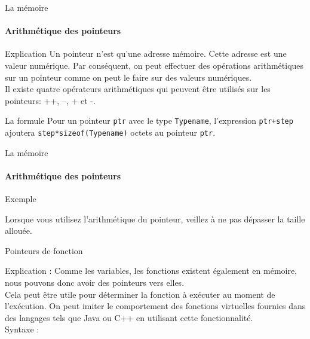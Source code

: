 \documentclass{beamer}
\begin{document}
\begin{darkframes}
	\begin{frame}{La mémoire}
		\framesubtitle{Arithmétique des pointeurs}
		\begin{block}{Explication}
			Un pointeur n'est qu'une adresse mémoire. Cette adresse est une valeur numérique. Par conséquent, on peut effectuer des opérations arithmétiques sur un pointeur comme on peut le faire sur des valeurs numériques.\\ 
			Il existe quatre opérateurs arithmétiques qui peuvent être utilisés sur les pointeurs: \alert{++}, \alert{--}, \alert{+} et \alert{-}.
		\end{block}
		\begin{block}{La formule}
			Pour un pointeur \texttt{ptr} avec le type \texttt{Typename}, l'expression \texttt{ptr+step} ajoutera \texttt{step*sizeof(Typename)} octets au pointeur \texttt{ptr}.
		\end{block}
	\end{frame}
  	
  	\begin{frame}{La mémoire}
  		\framesubtitle{Arithmétique des pointeurs}
  		\begin{exampleblock}{Exemple}
  			\ptrArithExmp
  		\end{exampleblock}
  	
  		\begin{alertblock}{Lorsque vous utilisez l'arithmétique du pointeur, veillez à ne pas dépasser la taille allouée.}
  		\end{alertblock}
  	\end{frame}


  	\begin{frame}{Pointeurs de fonction}
  		\begin{block}{Explication :}
  			Comme les variables, les fonctions existent également en mémoire, nous pouvons donc avoir des pointeurs vers elles. \\
  			Cela peut être utile pour déterminer la fonction à exécuter au moment de l'exécution. On peut imiter le comportement des fonctions virtuelles fournies dans des langages tels que Java ou C++ en utilisant cette fonctionnalité.\\
  			\alert{Syntaxe :}
  			\funcPtrSyntax
  		\end{block}
  	\end{frame}
  	

\end{darkframes}
\end{document}
